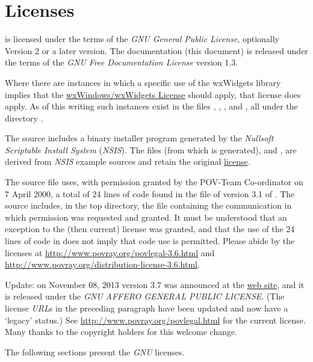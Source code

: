\chapter{Licenses}%
\label{chap:licenses}

	\IXpkgu{} is licensed under the terms of the \emph{GNU
	General Public License}, optionally Version 2 or a later version.
	The \IXpkg{} documentation (this document) is released under
	the terms of the
	\emph{GNU Free Documentation License} version 1.3.

	Where there are instances in which a specific use of the
	wxWidgets library implies that the
	\href{http://www.wxwidgets.org/about/newlicen.htm}{wxWindows/wxWidgets License}
	should apply, that license does apply.
	As of this writing such instances exist in the files
	, ,
	, and ,
	all under the directory .

	The \IXpkg{} source includes a binary installer program
	generated by the
	\emph{Nullsoft Scriptable Install System} (\emph{NSIS}). The
	files  (from which
	 is generated), and
	,
	are derived from \emph{NSIS} example sources and
	retain the original
	\href{http://nsis.sourceforge.net/License}{license}.
	
	The source file  uses,
	with permission granted
	by the POV-Team Co-ordinator on 7 April 2000,
	a total of 24 lines of code found in
	the file  of version 3.1 of \IXpov{}.
	The \IXpkg{} source includes, in the  top
	directory, the file
	 containing the communication
	in which permission was requested and granted. It must be
	understood that an exception to the (then current) license
	was granted, and that the use of the 24 lines of code in
	\IXpkg{} does not imply that \IXpov{} code use is
	permitted. Please abide by the \IXpov{} licenses at
	\url{http://www.povray.org/povlegal-3.6.html} and
	\url{http://www.povray.org/distribution-license-3.6.html}.
	
	Update: on November 08, 2013 \IXpov{} version 3.7 was
	announced at the
	\href{http://www.povray.org/}{\IXpov{} web site}, and
	it is released under the
	\emph{GNU AFFERO GENERAL PUBLIC LICENSE}.
	(The license \emph{URL}s in the preceding paragraph have been
	updated and now have a `legacy' status.)
	See \url{http://www.povray.org/povlegal.html} for the
	current license. Many thanks to the \IXpov{} copyright
	holders for this welcome change.

	The following sections present the \emph{GNU} licenses.

